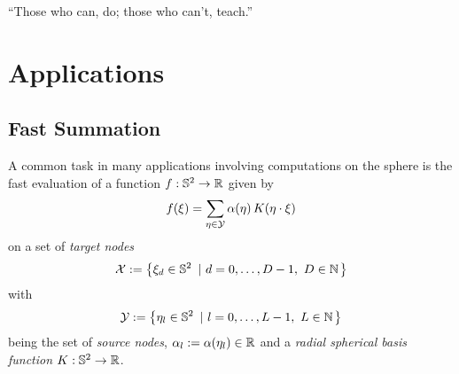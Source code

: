 \begin{savequote}[8cm]
  ``Those who can, do; those who can't, teach.''
\end{savequote}
\makeatletter
\chapter{Applications}
\label{Applications}

\section{Fast Summation}

A common task in many applications involving computations on the sphere is the fast evaluation of a function $f: \mathbb{S}^2 \rightarrow \mathbb{R}$ given by
\begin{equation}
  \label{Applications:KernelSum}
  f{\hspace{-0.4ex}}\left(\xi\right) = \sum_{\mathbf{\eta} \in \mathcal{Y}} \alpha{\hspace{-0.4ex}}\left(\mathbf{\eta}\right) K{\hspace{-0.4ex}}\left(\mathbf{\eta} \cdot \mathbf{\xi}\right)
\end{equation}
on a set of \emph{target nodes} 
$$
  \mathcal{X} := \left\{\mathbf{\xi}_{d} \in \mathbb{S}^2\ \left|\ d=0,\ldots,D-1,\ D \in \mathbb{N}\right.\right\rbrace
$$ 
with 
$$
  \mathcal{Y} := \left\{\mathbf{\eta}_{l} \in \mathbb{S}^2\ \left|\ l = 0,\ldots,L-1,\ L \in \mathbb{N}\right.\right\rbrace
$$
being the set of \emph{source nodes}, $\alpha_{l} := \alpha{\hspace{-0.4ex}}\left(\mathbf{\eta}_{l}\right) \in \mathbb{R}$ and a \emph{radial spherical basis function} $K: \mathbb{S}^2 \rightarrow \mathbb{R}$. 


